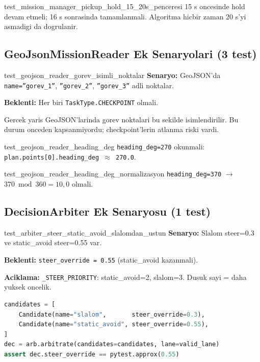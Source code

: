 \documentclass[a4paper,12pt]{article}
\begin{document}
\begin{testbox}{test\_mission\_manager\_pickup\_hold\_15\_20s\_penceresi}
15 s oncesinde hold devam etmeli; 16 s sonrasinda tamamlanmali.
Algoritma hicbir zaman 20 s'yi asmadigi da dogrulanir.
\end{testbox}

\subsection{GeoJsonMissionReader Ek Senaryolari (3 test)}

\begin{testbox}{test\_geojson\_reader\_gorev\_isimli\_noktalar}
\textbf{Senaryo:} GeoJSON'da \texttt{name=''gorev\_1''},
\texttt{''gorev\_2''}, \texttt{''gorev\_3''} adli noktalar.

\textbf{Beklenti:} Her biri \texttt{TaskType.CHECKPOINT} olmali.

\begin{specbox}
Gercek yaris GeoJSON'larinda gorev noktalari bu sekilde isimlendirilir.
Bu durum onceden kapsanmiyordu; checkpoint'lerin atlanma riski vardi.
\end{specbox}
\end{testbox}

\begin{testbox}{test\_geojson\_reader\_heading\_deg}
\texttt{heading\_deg=270} okunmali:
\texttt{plan.points[0].heading\_deg $\approx$ 270.0}.
\end{testbox}

\begin{testbox}{test\_geojson\_reader\_heading\_deg\_normalizasyon}
\texttt{heading\_deg=370} $\to$ $370 \bmod 360 = 10{,}0$ olmali.
\end{testbox}

\subsection{DecisionArbiter Ek Senaryosu (1 test)}

\begin{testbox}{test\_arbiter\_steer\_static\_avoid\_slalomdan\_ustun}
\textbf{Senaryo:} Slalom steer=0.3 ve static\_avoid steer=0.55 var.

\textbf{Beklenti:} \texttt{steer\_override = 0.55} (static\_avoid kazanmali).

\textbf{Aciklama:} \texttt{\_STEER\_PRIORITY}: static\_avoid=2, slalom=3.
Dusuk sayi = daha yuksek oncelik.

\begin{lstlisting}[language=Python]
candidates = [
    Candidate(name="slalom",       steer_override=0.3),
    Candidate(name="static_avoid", steer_override=0.55),
]
dec = arb.arbitrate(candidates=candidates, lane=valid_lane)
assert dec.steer_override == pytest.approx(0.55)
\end{lstlisting}
\end{testbox}
\end{document}
